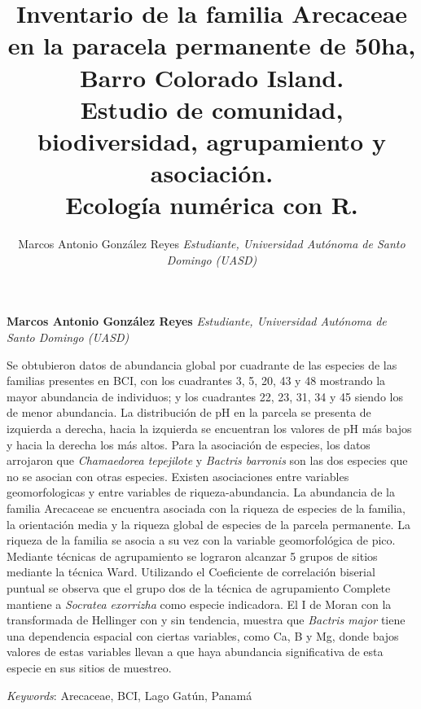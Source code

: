 \documentclass[11pt,]{article}
\title{Inventario de la familia Arecaceae en la paracela permanente de 50ha,
Barro Colorado Island.\\
Estudio de comunidad, biodiversidad, agrupamiento y asociación.\\
Ecología numérica con R.  }
\author{\Large Marcos Antonio González Reyes\vspace{0.05in} \newline\normalsize\emph{Estudiante, Universidad Autónoma de Santo Domingo (UASD)}  }
\date{}
\newcommand*{\authorfont}{\fontfamily{phv}\selectfont}
\renewenvironment{abstract}
 {{%
    \setlength{\leftmargin}{0mm}
    \setlength{\rightmargin}{\leftmargin}%
  }%
  \relax}
 {\endlist}
\begin{document}
	
%

{%
\setlength{\parindent}{0pt}
\thispagestyle{plain}
{\fontsize{18}{20}\selectfont\raggedright 
\maketitle  %

}

{
   \vskip 13.5pt\relax \normalsize\fontsize{11}{12} 
\textbf{\authorfont Marcos Antonio González Reyes} \hskip 15pt \emph{\small Estudiante, Universidad Autónoma de Santo Domingo (UASD)}   

}

}








\begin{abstract}

    \hbox{\vrule height .2pt width 39.14pc}

    \vskip 8.5pt %

\noindent Se obtubieron datos de abundancia global por cuadrante de las especies
de las familias presentes en BCI, con los cuadrantes 3, 5, 20, 43 y 48
mostrando la mayor abundancia de individuos; y los cuadrantes 22, 23,
31, 34 y 45 siendo los de menor abundancia. La distribución de pH en la
parcela se presenta de izquierda a derecha, hacia la izquierda se
encuentran los valores de pH más bajos y hacia la derecha los más altos.
Para la asociación de especies, los datos arrojaron que
\emph{Chamaedorea tepejilote} y \emph{Bactris barronis} son las dos
especies que no se asocian con otras especies. Existen asociaciones
entre variables geomorfologicas y entre variables de riqueza-abundancia.
La abundancia de la familia Arecaceae se encuentra asociada con la
riqueza de especies de la familia, la orientación media y la riqueza
global de especies de la parcela permanente. La riqueza de la familia se
asocia a su vez con la variable geomorfológica de pico. Mediante
técnicas de agrupamiento se lograron alcanzar 5 grupos de sitios
mediante la técnica Ward. Utilizando el Coeficiente de correlación
biserial puntual se observa que el grupo dos de la técnica de
agrupamiento Complete mantiene a \emph{Socratea exorrizha} como especie
indicadora. El I de Moran con la transformada de Hellinger con y sin
tendencia, muestra que \emph{Bactris major} tiene una dependencia
espacial con ciertas variables, como Ca, B y Mg, donde bajos valores de
estas variables llevan a que haya abundancia significativa de esta
especie en sus sitios de muestreo.


\vskip 8.5pt \noindent \emph{Keywords}: Arecaceae, BCI, Lago Gatún, Panamá \par

    \hbox{\vrule height .2pt width 39.14pc}



\end{abstract}
\end{document}
